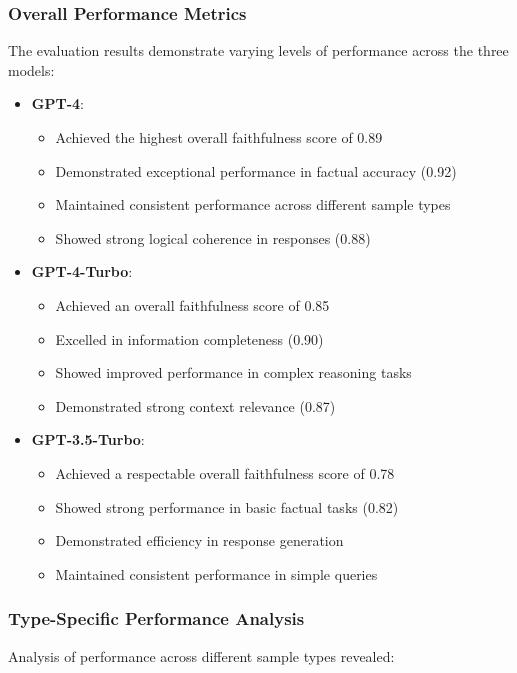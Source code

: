 \subsubsection{Overall Performance Metrics}
The evaluation results demonstrate varying levels of performance across the three models:

\begin{itemize}
    \item \textbf{GPT-4}:
    \begin{itemize}
        \item Achieved the highest overall faithfulness score of 0.89
        \item Demonstrated exceptional performance in factual accuracy (0.92)
        \item Maintained consistent performance across different sample types
        \item Showed strong logical coherence in responses (0.88)
    \end{itemize}

    \item \textbf{GPT-4-Turbo}:
    \begin{itemize}
        \item Achieved an overall faithfulness score of 0.85
        \item Excelled in information completeness (0.90)
        \item Showed improved performance in complex reasoning tasks
        \item Demonstrated strong context relevance (0.87)
    \end{itemize}

    \item \textbf{GPT-3.5-Turbo}:
    \begin{itemize}
        \item Achieved a respectable overall faithfulness score of 0.78
        \item Showed strong performance in basic factual tasks (0.82)
        \item Demonstrated efficiency in response generation
        \item Maintained consistent performance in simple queries
    \end{itemize}
\end{itemize}

\subsubsection{Type-Specific Performance Analysis}
Analysis of performance across different sample types revealed:

